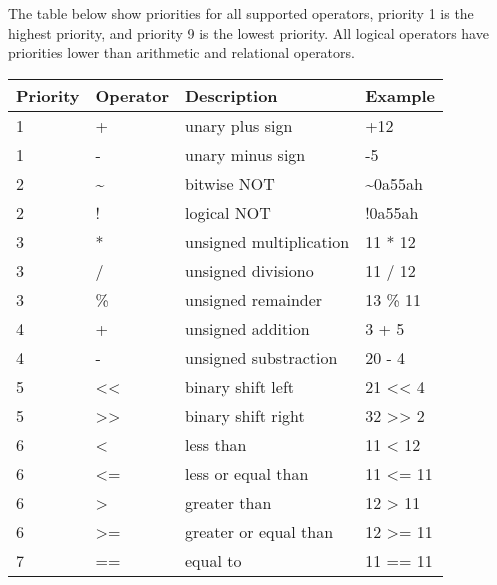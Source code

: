        The table below show priorities for all supported operators, priority 1 is the highest priority, and priority 9 is the lowest priority. All logical operators have priorities lower than arithmetic and relational operators.

        \begin{table}[h!]
            \centering
            \begin{tabular}{|l|l|l|l|}
                \hline
                \textbf{Priority} & \textbf{Operator} & \textbf{Description} & \textbf{Example} \\\hline
                1        & +        & unary plus sign         & +12             \\\hline
                1        & -        & unary minus sign        & -5              \\\hline
                2        & \~{}     & bitwise NOT             & \~{}0a55ah      \\\hline
                2        & !        & logical NOT             & !0a55ah         \\\hline
                3        & *        & unsigned multiplication & 11 * 12         \\\hline
                3        & /        & unsigned divisiono      & 11 / 12         \\\hline
                3        & \%       & unsigned remainder      & 13 \% 11        \\\hline
                4        & +        & unsigned addition       & 3 + 5           \\\hline
                4        & -        & unsigned substraction   & 20 - 4          \\\hline
                5        & <{}<     & binary shift left       & 21 <{}< 4       \\\hline
                5        & >{}>     & binary shift right      & 32 >{}> 2       \\\hline
                6        & <        & less than               & 11 < 12         \\\hline
                6        & <=       & less or equal than      & 11 <= 11        \\\hline
                6        & >        & greater than            & 12 > 11         \\\hline
                6        & >=       & greater or equal than   & 12 >= 11        \\\hline
                7        & ==       & equal to                & 11 == 11        \\\hline

\end{tabular}
\end{table}
